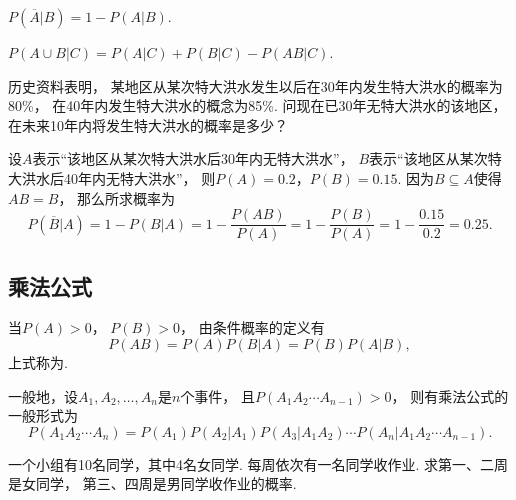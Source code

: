 \begin{property}
\(P(\overline{A} \vert B)
= 1 - P(A \vert B)\).
\end{property}

\begin{property}
\(P(A \cup B \vert C)
= P(A \vert C) + P(B \vert C) - P(AB \vert C)\).
\end{property}

\begin{example}
历史资料表明，
某地区从某次特大洪水发生以后在30年内发生特大洪水的概率为80\%，
在40年内发生特大洪水的概念为85\%.
问现在已30年无特大洪水的该地区，
在未来10年内将发生特大洪水的概率是多少？
\begin{solution}
设\(A\)表示“该地区从某次特大洪水后30年内无特大洪水”，
\(B\)表示“该地区从某次特大洪水后40年内无特大洪水”，
则\(P(A) = 0.2\)，\(P(B) = 0.15\).
因为\(B \subseteq A\)使得\(AB = B\)，
那么所求概率为\begin{equation*}
	P(\overline{B} \vert A)
	= 1 - P(B \vert A)
	= 1 - \frac{P(AB)}{P(A)}
	= 1 - \frac{P(B)}{P(A)}
	= 1 - \frac{0.15}{0.2}
	= 0.25.
\end{equation*}
\end{solution}
\end{example}

\subsection{乘法公式}
\begin{theorem}[概率的乘法]
当\(P(A) > 0\)，
\(P(B) > 0\)，
由条件概率的定义有\begin{equation}
	P(AB) = P(A) P(B \vert A) = P(B) P(A \vert B),
\end{equation}
上式称为.

一般地，设\(A_1,A_2,\dotsc,A_n\)是\(n\)个事件，
且\(P(A_1 A_2 \dotsm A_{n-1}) > 0\)，
则有乘法公式的一般形式为\begin{equation}
	P(A_1 A_2 \dotsm A_n)
	= P(A_1) P(A_2 \vert A_1) P(A_3 \vert A_1 A_2) \dotsm P(A_n \vert A_1 A_2 \dotsm A_{n-1}).
\end{equation}
\end{theorem}

\begin{example}
一个小组有10名同学，其中4名女同学.
每周依次有一名同学收作业.
求第一、二周是女同学，
第三、四周是男同学收作业的概率.
\end{example}

